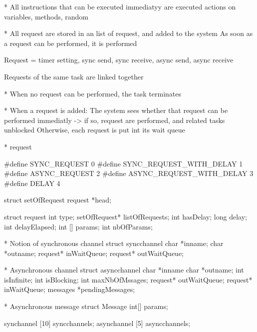 * All instructions that can be executed immediatyy are executed
actions on variables, methods, random


* All request are stored in an list of request, and added to the system
As soon as a request can be performed, it is performed

Request = timer setting, sync send, sync receive, async send, async receive

Requests of the same task are linked together


* When no request can be performed, the task terminates

* When a request is added:
The system sees whether that request can be performed immediatly -> if so, request are performed, and related tasks unblocked
Otherwise, each request is put int its wait queue


* request

#define SYNC_REQUEST 0
#define SYNC_REQUEST_WITH_DELAY 1
#define ASYNC_REQUEST 2
#define ASYNC_REQUEST_WITH_DELAY 3
#define DELAY 4

struct setOfRequest {
  request *head;
}

struct request {
  int type;
  setOfRequest* listOfRequests;
  int hasDelay;
  long delay;
  int delayElapsed;
  int [] params;
  int nbOfParams;
}


* Notion of synchronous channel
struct syncchannel {
  char *inname;
  char *outname;
  request* inWaitQueue;
  request* outWaitQueue; 
}

* Asynchronous channel
struct asyncchannel {
  char *inname
  char *outname;
  int isInfinite;
  int isBlocking;
  int maxNbOfMssages;
  request* outWaitQueue;
  request* inWaitQueue;
  messages *pendingMessages;
}

* Asynchronous message
struct Message {
  int[] params;
}



synchannel [10] syncchannels;
asynchannel [5] asyncchannels;

